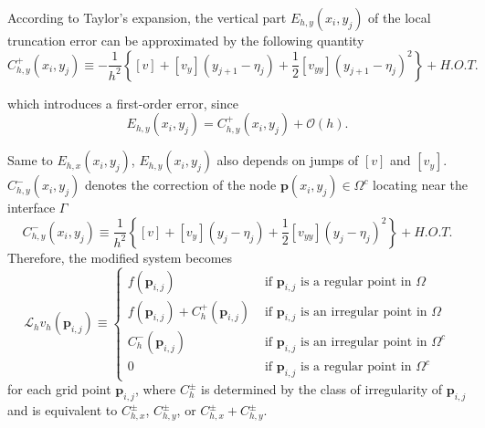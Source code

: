 \documentclass{article}
\begin{document}
According to Taylor's expansion, the vertical part $E_{h, y}\left(x_{i}, y_{j}\right)$ of the local truncation error can be approximated by the following quantity
$$
C_{h, y}^{+}\left(x_{i}, y_{j}\right) \equiv -\frac{1}{h^{2}}\left\{[v]+\left[v_{y}\right]\left(y_{j+1}-\eta_{j}\right)+\frac{1}{2}\left[v_{y y}\right]\left(y_{j+1}-\eta_{j}\right)^{2}\right\} + H.O.T.
$$

which introduces a first-order error, since
$$
E_{h, y}\left(x_{i}, y_{j}\right)=C_{h, y}^{+}\left(x_{i}, y_{j}\right)+\mathcal{O}(h).
$$

Same to $E_{h, x}(x_{i}, y_{j})$, $E_{h, y}(x_{i}, y_{j})$ also depends on jumps of $[v]$ and $[v_{y}]$. $C^{-}_{h,y}(x_{i}, y_{j})$ denotes the correction of the node $\mathbf{p}(x_{i}, y_{j}) \in \Omega^{c}$ locating near the interface $\Gamma$
$$
C_{h, y}^{-}\left(x_{i}, y_{j}\right) \equiv \frac{1}{h^{2}}\left\{[v]+\left[v_{y}\right]\left(y_{j}-\eta_{j}\right)+\frac{1}{2}\left[v_{y y}\right]\left(y_{j}-\eta_{j}\right)^{2}\right\} + H.O.T.
$$
Therefore, the modified system becomes 
\begin{equation}
\mathcal{L}_{h}v_{h}(\mathbf{p}_{i,j})
\equiv \begin{cases}f\left(\mathbf{p}_{i,j}\right) & \text { if } \mathbf{p}_{i,j} \text { is a regular point in } \Omega \\ f\left(\mathbf{p}_{i,j}\right)+C^+_{h}\left(\mathbf{p}_{i,j}\right) & \text { if } \mathbf{p}_{i,j} \text { is an irregular point in } \Omega \\ C^-_{h}\left(\mathbf{p}_{i,j}\right) & \text { if } \mathbf{p}_{i,j} \text { is an irregular point in } \Omega^c \\ 0 & \text { if } \mathbf{p}_{i,j} \text { is a regular point in } \Omega^c\end{cases}
\end{equation}
for each grid point $\mathbf{p}_{i,j}$, where $C^{\pm}_{h}$ is determined by the class of irregularity of $\mathbf{p}_{i,j}$ and is equivalent to $C^{\pm}_{h, x}$, $C^{\pm}_{h, y}$, or $C^{\pm}_{h, x} + C^{\pm}_{h, y}$.
\end{document}
